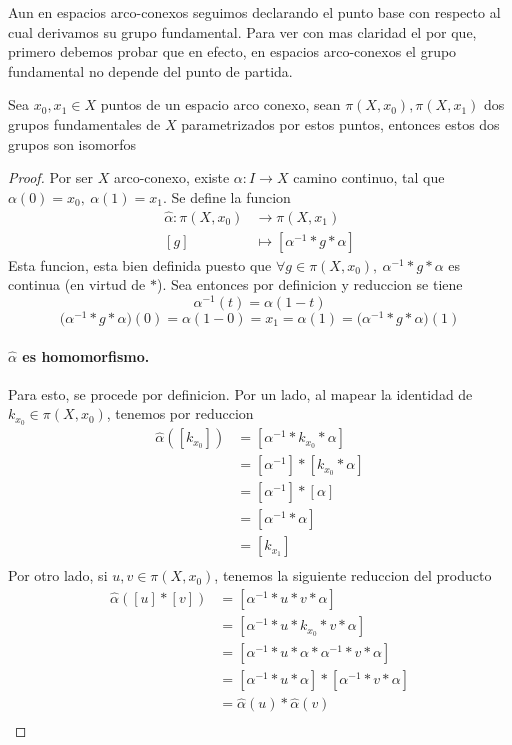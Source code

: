 {Aun en espacios arco-conexos seguimos declarando el punto base con
respecto al cual derivamos su grupo fundamental. Para ver con mas
claridad el por que, primero debemos probar que en efecto, en espacios
arco-conexos el grupo fundamental no depende del punto de partida.
\begin{teorema} \label{not:alpha-hat}
  Sea \(x_0 , x_1 \in X\) puntos de un espacio arco conexo, sean \(\pi
  (X, x_0), \pi (X, x_1)\) dos grupos fundamentales de \(X\)
  parametrizados por estos puntos, entonces estos dos grupos son isomorfos
\end{teorema}
\begin{proof}
  Por ser \(X\) arco-conexo, existe \(\alpha : I \to X\) camino
  continuo, tal que \(\alpha (0) = x_0,\ \alpha (1) = x_1\). Se define
  la funcion
  \begin{align*}
    \hat \alpha : \pi (X, x_0) &\to \pi (X, x_1) \\
    [g] &\mapsto [ \alpha^{-1} * g * \alpha ]
  \end{align*}
  Esta funcion, esta bien definida puesto que \(\forall g \in \pi (X,
  x_0),\ \alpha^{-1} * g * \alpha \) es continua (en virtud de \(*\)).
  Sea entonces por definicion y reduccion se tiene
  \[ \alpha^{-1} (t) = \alpha (1 - t)\]
  \[\big(\alpha^{-1} * g * \alpha \big) (0) = \alpha (1 - 0) = x_1 = \alpha (1) =
    \big(\alpha^{-1} * g * \alpha \big) (1)\]

  \paragraph{\(\hat \alpha\) es homomorfismo.} Para esto, se procede por
  definicion. Por un lado, al mapear la identidad de \(k_{x_0} \in \pi
  (X, x_0) \), tenemos por reduccion
  \begin{align*}
    \hat \alpha ([k_{x_0}])
                 &= [\alpha^{-1} * k_{x_0} * \alpha] \\
                 &= [\alpha^{-1}] * [k_{x_0} * \alpha] \\
                 &= [\alpha^{-1}] * [\alpha] \\
                 &= [\alpha^{-1} * \alpha] \\
                 &= [k_{x_1}] \\
  \end{align*}
  Por otro lado, si \(u,v \in \pi (X, x_0) \), tenemos la siguiente
  reduccion del producto
  \begin{align*}
    \hat \alpha ([u] * [v]) &= [\alpha^{-1} * u * v * \alpha] \\
    &= [\alpha^{-1} * u * k_{x_0} * v * \alpha] \\
    &= [\alpha^{-1} * u * \alpha * \alpha^{-1} * v * \alpha] \\
    &= [\alpha^{-1} * u * \alpha ] * [ \alpha^{-1} * v * \alpha] \\
    &= \hat \alpha (u) * \hat \alpha (v) \\
  \end{align*}


\end{proof}}
